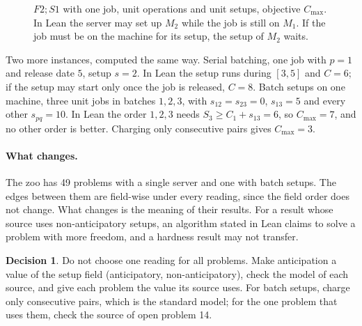 \documentclass[11pt]{article}
\newcommand{\Cmax}{C_{\max}}
\theoremstyle{definition}
\newtheorem{decision}{Decision}
\newcommand{\gbar}[5]{\fill[#4] (#2,#1-0.35) rectangle (#3,#1+0.35);
  \draw (#2,#1-0.35) rectangle (#3,#1+0.35); \node at ({(#2+#3)/2},#1) {\small #5};}
\newcommand{\gaxis}[2]{\draw[->] (0,#1) -- (#2+0.4,#1);
  \foreach \t in {0,...,#2} \draw (\t,#1+0.08) -- (\t,#1-0.08) node[below] {\scriptsize \t};}
\begin{document}
\begin{figure}[ht]
\centering
{}
\caption{$F2;S1$ with one job, unit operations and unit setups, objective
$\Cmax$. In Lean the server may set up $M_2$ while the job is still on $M_1$.
If the job must be on the machine for its setup, the setup of $M_2$ waits.}
\label{fig:setup}
\end{figure}

Two more instances, computed the same way. Serial batching, one job with
$p=1$ and release date $5$, setup $s=2$. In Lean the setup runs during
$[3,5]$ and $C=6$; if the setup may start only once the job is released,
$C=8$. Batch setups on one machine, three unit jobs in batches $1,2,3$, with
$s_{12}=s_{23}=0$, $s_{13}=5$ and every other $s_{pq}=10$. In Lean the order
$1,2,3$ needs $S_3 \ge C_1 + s_{13} = 6$, so $\Cmax = 7$, and no other order is
better. Charging only consecutive pairs gives $\Cmax = 3$.

\paragraph{What changes.} The zoo has 49 problems with a single server and one
with batch setups. The edges between them are field-wise under every
reading, since the field order does not change. What changes is the meaning of
their results. For a result whose source uses non-anticipatory setups, an
algorithm stated in Lean claims to solve a problem with more freedom, and a
hardness result may not transfer.

\begin{decision}
Do not choose one reading for all problems. Make anticipation a value of the
setup field (anticipatory, non-anticipatory), check the model of each source,
and give each problem the value its source uses. For batch setups, charge only
consecutive pairs, which is the standard model; for the one problem that uses
them, check the source of open problem 14.
\end{decision}
\end{document}
